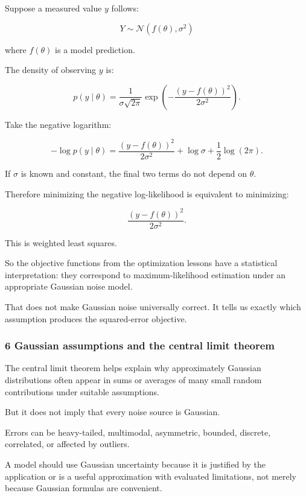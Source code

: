 \hypertarget{02-foundations-ii-ch023-gaussian-log-likelihood-and-least-squares}{}

Suppose a measured value \(y\) follows:

\[
 Y\sim\mathcal N(f(\theta),\sigma^2)
\]

where \(f(\theta)\) is a model prediction.

The density of observing \(y\) is:

\[
 p(y\mid\theta) = \frac1{\sigma\sqrt{2\pi}} \exp\left( -\frac{(y-f(\theta))^2}{2\sigma^2} \right).
\]

Take the negative logarithm:

\[
 -\log p(y\mid\theta) = \frac{(y-f(\theta))^2}{2\sigma^2} +\log\sigma+\frac12\log(2\pi).
\]

If \(\sigma\) is known and constant, the final two terms do not depend on \(\theta\).

Therefore minimizing the negative log-likelihood is equivalent to minimizing:

\[
 \boxed{ \frac{(y-f(\theta))^2}{2\sigma^2} }.
\]

This is weighted least squares.

So the objective functions from the optimization lessons have a statistical interpretation: they correspond to maximum-likelihood estimation under an appropriate Gaussian noise model.

That does not make Gaussian noise universally correct. It tells us exactly which assumption produces the squared-error objective.

\subsubsection{6 Gaussian assumptions and the central limit theorem}\label{02-foundations-ii-ch023-gaussian-assumptions-and-the-central-limit-theorem}

\hypertarget{02-foundations-ii-ch023-gaussian-assumptions-and-the-central-limit-theorem}{}

The central limit theorem helps explain why approximately Gaussian distributions often appear in sums or averages of many small random contributions under suitable assumptions.

But it does not imply that every noise source is Gaussian.

Errors can be heavy-tailed, multimodal, asymmetric, bounded, discrete, correlated, or affected by outliers.

A model should use Gaussian uncertainty because it is justified by the application or is a useful approximation with evaluated limitations, not merely because Gaussian formulas are convenient.

